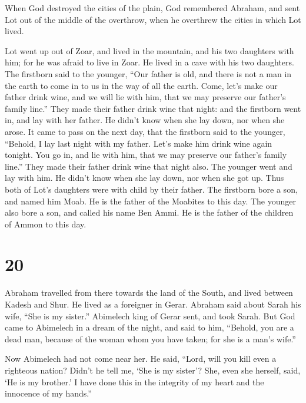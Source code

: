  When God destroyed the cities of the plain, God remembered
Abraham, and sent Lot out of the middle of the overthrow, when he
overthrew the cities in which Lot lived.

 Lot went up out of Zoar, and lived in the mountain, and
his two daughters with him; for he was afraid to live in Zoar. He lived
in a cave with his two daughters.  The firstborn said to
the younger, ``Our father is old, and there is not a man in the earth to
come in to us in the way of all the earth.  Come, let's
make our father drink wine, and we will lie with him, that we may
preserve our father's family line.''  They made their
father drink wine that night: and the firstborn went in, and lay with
her father. He didn't know when she lay down, nor when she arose.
 It came to pass on the next day, that the firstborn said
to the younger, ``Behold, I lay last night with my father. Let's make
him drink wine again tonight. You go in, and lie with him, that we may
preserve our father's family line.''  They made their
father drink wine that night also. The younger went and lay with him. He
didn't know when she lay down, nor when she got up.  Thus
both of Lot's daughters were with child by their father. 
The firstborn bore a son, and named him Moab. He is the father of the
Moabites to this day.  The younger also bore a son, and
called his name Ben Ammi. He is the father of the children of Ammon to
this day.

\hypertarget{section-19}{%
\section{20}\label{section-19}}

 Abraham travelled from there towards the land of the South,
and lived between Kadesh and Shur. He lived as a foreigner in Gerar.
 Abraham said about Sarah his wife, ``She is my sister.''
Abimelech king of Gerar sent, and took Sarah.  But God came
to Abimelech in a dream of the night, and said to him, ``Behold, you are
a dead man, because of the woman whom you have taken; for she is a man's
wife.''

 Now Abimelech had not come near her. He said, ``Lord, will
you kill even a righteous nation?  Didn't he tell me, `She
is my sister'? She, even she herself, said, `He is my brother.' I have
done this in the integrity of my heart and the innocence of my hands.''

